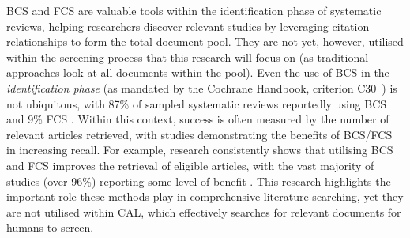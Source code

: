 \documentclass[10pt,oneside]{book}
\begin{document}
BCS and FCS are valuable tools within the identification phase of systematic reviews, helping researchers discover relevant studies by leveraging citation relationships to form the total document pool. They are not yet, however, utilised within the screening process that this research will focus on (as traditional approaches look at all documents within the pool). Even the use of BCS in the \emph{identification phase} (as mandated by the Cochrane Handbook, criterion C30~\cite{noauthor_mecir_nodate}) is not ubiquitous, with 87\% of sampled systematic reviews reportedly using BCS and 9\% FCS \cite{briscoe_conduct_2019}. Within this context, success is often measured by the number of relevant articles retrieved, with studies demonstrating the benefits of BCS/FCS in increasing recall. For example, research consistently shows that utilising BCS and FCS improves the retrieval of eligible articles, with the vast majority of studies (over 96\%) reporting some level of benefit \cite{hirt_citation_2023}. This research highlights the important role these methods play in comprehensive literature searching, yet they are not utilised within CAL, which effectively searches for relevant documents for humans to screen.   
\end{document}
